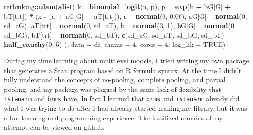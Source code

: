 \documentclass[11pt, oneside, openany]{scrbook}
\newenvironment{Shaded}{\begin{snugshade}}{\end{snugshade}}
\newcommand{\DataTypeTok}[1]{\textcolor[rgb]{0.13,0.29,0.53}{#1}}
\newcommand{\DecValTok}[1]{\textcolor[rgb]{0.00,0.00,0.81}{#1}}
\newcommand{\FloatTok}[1]{\textcolor[rgb]{0.00,0.00,0.81}{#1}}
\newcommand{\KeywordTok}[1]{\textcolor[rgb]{0.13,0.29,0.53}{\textbf{#1}}}
\newcommand{\NormalTok}[1]{#1}
\newcommand{\OperatorTok}[1]{\textcolor[rgb]{0.81,0.36,0.00}{\textbf{#1}}}
\newcommand{\OtherTok}[1]{\textcolor[rgb]{0.56,0.35,0.01}{#1}}
\newcommand{\StringTok}[1]{\textcolor[rgb]{0.31,0.60,0.02}{#1}}
\begin{document}
\begin{Shaded}
\begin{Highlighting}[]
\NormalTok{rethinking}\OperatorTok{::}\KeywordTok{ulam}\NormalTok{(}\KeywordTok{alist}\NormalTok{(}
\NormalTok{  k }\OperatorTok{~}\StringTok{ }\KeywordTok{binomial_logit}\NormalTok{(n, p),}
  \DataTypeTok{p =} \KeywordTok{exp}\NormalTok{(b }\OperatorTok{+}\StringTok{ }\NormalTok{bG[G] }\OperatorTok{+}\StringTok{ }\NormalTok{bT[trt]) }\OperatorTok{*}\StringTok{ }\NormalTok{(x }\OperatorTok{-}\StringTok{ }\NormalTok{(a }\OperatorTok{+}\StringTok{ }\NormalTok{aG[G] }\OperatorTok{+}\StringTok{ }\NormalTok{aT[trt])),}
\NormalTok{  a }\OperatorTok{~}\StringTok{ }\KeywordTok{normal}\NormalTok{(}\DecValTok{0}\NormalTok{, }\FloatTok{0.06}\NormalTok{),}
\NormalTok{  aG[G] }\OperatorTok{~}\StringTok{ }\KeywordTok{normal}\NormalTok{(}\DecValTok{0}\NormalTok{, sd_aG),}
\NormalTok{  aT[trt] }\OperatorTok{~}\StringTok{ }\KeywordTok{normal}\NormalTok{(}\DecValTok{0}\NormalTok{, sd_aT),}
\NormalTok{  b }\OperatorTok{~}\StringTok{ }\KeywordTok{normal}\NormalTok{(}\DecValTok{3}\NormalTok{, }\DecValTok{1}\NormalTok{),}
\NormalTok{  bG[G] }\OperatorTok{~}\StringTok{ }\KeywordTok{normal}\NormalTok{(}\DecValTok{0}\NormalTok{, sd_bG),}
\NormalTok{  bT[trt] }\OperatorTok{~}\StringTok{ }\KeywordTok{normal}\NormalTok{(}\DecValTok{0}\NormalTok{, sd_bT),}
  \KeywordTok{c}\NormalTok{(sd_aG, sd_aT, sd_bG, sd_bT) }\OperatorTok{~}\StringTok{ }\KeywordTok{half_cauchy}\NormalTok{(}\DecValTok{0}\NormalTok{, }\DecValTok{5}\NormalTok{)}
\NormalTok{), }\DataTypeTok{data =}\NormalTok{ df, }\DataTypeTok{chains =} \DecValTok{4}\NormalTok{, }\DataTypeTok{cores =} \DecValTok{4}\NormalTok{, }\DataTypeTok{log_lik =} \OtherTok{TRUE}\NormalTok{)}
\end{Highlighting}
\end{Shaded}

During my time learning about multilevel models, I tried writing my own package that generates a Stan program based on R formula syntax. At the time I didn't fully understand the concepts of no-pooling, complete pooling, and partial pooling, and my package was plagued by the same lack of flexibility that \texttt{rstanarm} and \texttt{brms} have. In fact I learned that \texttt{brms} and \texttt{rstanarm} already did what I was trying to do after I had already started making my library, but it was a fun learning and programming experience. The fossilized remains of my attempt can be viewed on github.
\end{document}
